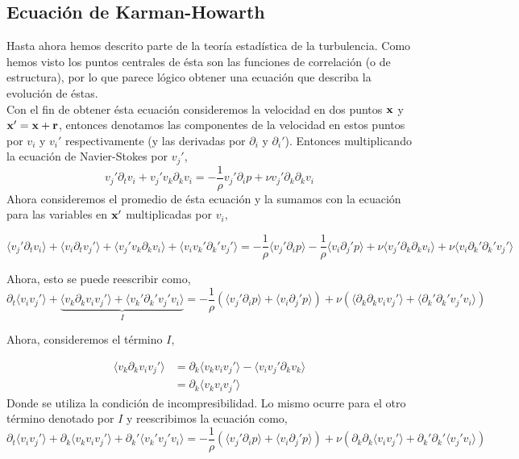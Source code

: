\documentclass[executivepaper,12pt]{article}
\numberwithin{equation}{section}
\begin{document}
\subsection{Ecuación de Karman-Howarth}

Hasta ahora hemos descrito parte de la teoría estadística de la turbulencia. Como hemos visto los puntos centrales de ésta son las funciones de correlación (o de estructura), por lo que parece lógico obtener una ecuación que describa la evolución de éstas.\\
Con el fin de obtener ésta ecuación consideremos la velocidad en dos puntos $\vb{x}$ y $\vb{x}'=\vb{x}+\vb{r}$, entonces denotamos las componentes de la velocidad en estos puntos por $v_i$ y $v_i'$ respectivamente (y las derivadas por $\partial_i$ y $\partial_i'$). Entonces multiplicando la ecuación de Navier-Stokes por $v_j'$, 
\begin{equation*}
	v_j'\partial_tv_i+v_j'v_k\partial_kv_i=-\frac{1}{\rho}v_j'\partial_i p + \nu v_j'\partial_k\partial_k v_i 
\end{equation*}
Ahora consideremos el promedio de ésta ecuación y la sumamos con la ecuación para las variables en $\vb{x}'$ multiplicadas por $v_i$, 

\begin{equation*}
\langle v_j'\partial_tv_i \rangle+\langle v_i\partial_tv_j' \rangle+\langle v_j'v_k\partial_kv_i\rangle+\langle v_iv_k'\partial_k'v_j'\rangle=-\frac{1}{\rho}\langle v_j'\partial_i p \rangle-\frac{1}{\rho}\langle v_i\partial_j' p \rangle + \nu \langle v_j'\partial_k\partial_k v_i \rangle+\nu \langle v_i\partial_k'\partial_k' v_j' \rangle
\end{equation*}

Ahora, esto se puede reescribir como,
\begin{equation*}
	\partial_t\langle v_iv_j' \rangle+\underbrace{\langle v_k\partial_kv_iv_j'\rangle+\langle v_k'\partial_k'v_j'v_i\rangle}_{I}=-\frac{1}{\rho}(\langle v_j'\partial_i p \rangle+\langle v_i\partial_j' p \rangle )+ \nu (\langle\partial_k\partial_k v_i v_j' \rangle+\langle \partial_k'\partial_k' v_j'v_i \rangle)
\end{equation*}

Ahora, consideremos el término $I$, 

\begin{align*}
	\langle v_k\partial_kv_iv_j'\rangle&=\partial_k\langle v_kv_iv_j'\rangle-\langle v_iv_j'\partial_kv_k\rangle\\
	&=\partial_k\langle v_kv_iv_j'\rangle
\end{align*}
Donde se utiliza la condición de incompresibilidad. Lo mismo ocurre para el otro término denotado por $I$ y reescribimos la ecuación como,
\begin{equation*}
	\partial_t\langle v_iv_j' \rangle+\partial_k\langle v_kv_iv_j'\rangle+\partial_k'\langle v_k'v_j'v_i\rangle=-\frac{1}{\rho}(\langle v_j'\partial_i p \rangle+\langle v_i\partial_j' p \rangle )+ \nu (\partial_k\partial_k\langle v_i v_j' \rangle+ \partial_k'\partial_k'\langle v_j'v_i \rangle)
\end{equation*}
\end{document}
